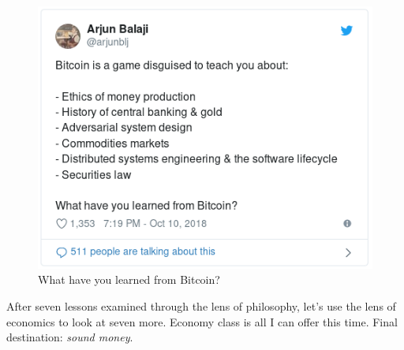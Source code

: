 \begin{figure}
  \includegraphics{assets/images/the-tweet.png}
  \caption{What have you learned from Bitcoin?}
  \label{fig:the-tweet}
\end{figure}

After seven lessons examined through the lens of philosophy, let’s use the lens
of economics to look at seven more. Economy class is all I can offer this time.
Final destination: \textit{sound money}.

